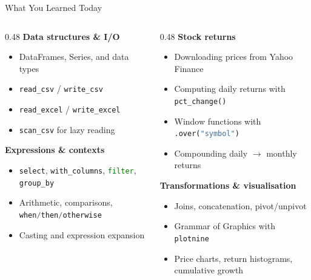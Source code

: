 \documentclass[9pt,aspectratio=169]{beamer}
\newcommand{\py}[1]{\lstinline[language=Python]{#1}}
\begin{document}
\begin{frame}{What You Learned Today}

\begin{columns}[T]
\begin{column}{0.48\textwidth}
\textbf{Data structures \& I/O}
\begin{itemize}
    \item DataFrames, Series, and data types
    \item \py{read_csv} / \py{write_csv}
    \item \py{read_excel} / \py{write_excel}
    \item \py{scan_csv} for lazy reading
\end{itemize}

\bigskip

\textbf{Expressions \& contexts}
\begin{itemize}
    \item \py{select}, \py{with_columns}, \py{filter}, \py{group_by}
    \item Arithmetic, comparisons, \py{when/then/otherwise}
    \item Casting and expression expansion
\end{itemize}
\end{column}
\begin{column}{0.48\textwidth}
\textbf{Stock returns}
\begin{itemize}
    \item Downloading prices from Yahoo Finance
    \item Computing daily returns with \py{pct_change()}
    \item Window functions with \py{.over("symbol")}
    \item Compounding daily $\to$ monthly returns
\end{itemize}

\bigskip

\textbf{Transformations \& visualisation}
\begin{itemize}
    \item Joins, concatenation, pivot/unpivot
    \item Grammar of Graphics with \texttt{plotnine}
    \item Price charts, return histograms, cumulative growth
\end{itemize}
\end{column}
\end{columns}

\end{frame}
\end{document}
